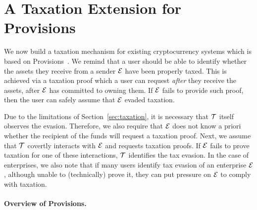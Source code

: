 \section{A Taxation Extension for Provisions}\label{sec:provisions-extension}

We now build a taxation mechanism for existing cryptocurrency systems which is
based on Provisions~\cite{CCS:DBBCB15}. We remind that a user should be able to
identify whether the assets they receive from a sender $\mathcal{E}$ have been
properly taxed. This is achieved via a taxation proof which a user can request
\emph{after} they receive the assets, \ie after $\mathcal{E}$ has committed to owning
them. If $\mathcal{E}$ fails to provide such proof, then the user can safely
assume that $\mathcal{E}$ evaded taxation.

Due to the limitations of Section~\ref{sec:taxation}, it is necessary that
$\mathcal{T}$ itself observes the evasion. Therefore, we also require that
$\mathcal{E}$ does not know a priori whether the recipient of the funds will
request a taxation proof. Next, we assume that $\mathcal{T}$ covertly interacts
with $\mathcal{E}$ and requests taxation proofs. If $\mathcal{E}$ fails to prove
taxation for one of these interactions, $\mathcal{T}$ identifies the tax evasion.
In the case of enterprises, we also note that if many users identify tax
evasion of an enterprise $\mathcal{E}$, although unable to (technically) prove
it, they can put pressure on $\mathcal{E}$ to comply with taxation.


\paragraph{Overview of Provisions.}\label{subsec:provisions-overview}

